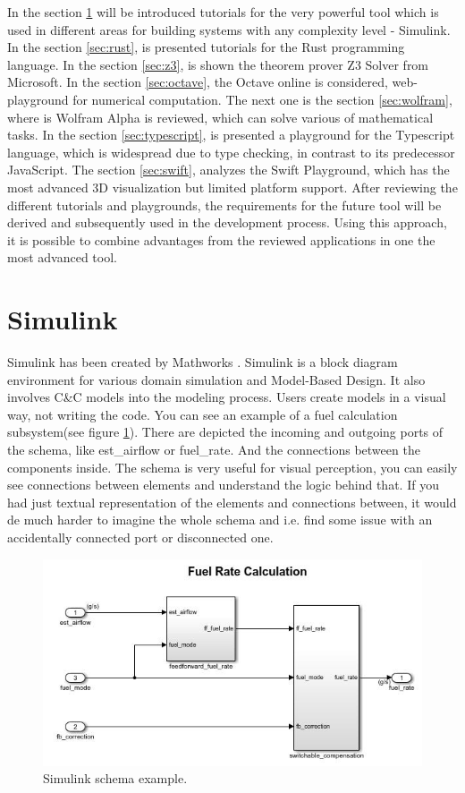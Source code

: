 In the section \ref{sec:simulink} will be introduced tutorials for the very powerful tool which is used in different areas for building systems with any complexity level - Simulink. In the section \ref{sec:rust}, is presented tutorials for the Rust programming language. In the section \ref{sec:z3}, is shown the theorem prover Z3 Solver from Microsoft. In the section \ref{sec:octave}, the Octave online is considered, web-playground for numerical computation. The next one is the section \ref{sec:wolfram}, where is Wolfram Alpha is reviewed, which can solve various of mathematical tasks. In the section \ref{sec:typescript}, is presented a playground for the Typescript language, which is widespread due to type checking, in contrast to its predecessor JavaScript. The section \ref{sec:swift}, analyzes the Swift Playground, which has the most advanced 3D visualization but limited platform support. After reviewing the different tutorials and playgrounds, the requirements for the future tool will be derived and subsequently used in the development process. Using this approach, it is possible to combine advantages from the reviewed applications in one the most advanced tool.

\section{Simulink} \label{sec:simulink}
Simulink has been created by Mathworks \cite{Mathworks}. Simulink is a block diagram environment for various domain simulation and Model-Based Design. It also involves C\&C models into the modeling process. Users create models in a visual way, not writing the code. You can see an example of a fuel calculation subsystem(see figure \ref{fig:simulink}). There are depicted the incoming and outgoing ports of the schema, like est\_airflow or fuel\_rate. And the connections between the components inside. The schema is very useful for visual perception, you can easily see connections between elements and understand the logic behind that. If you had just textual representation of the elements and connections between, it would de much harder to imagine the whole schema and i.e. find some issue with an accidentally connected port or disconnected one.

\begin{figure}[h!]
    \centering
    \includegraphics[width=0.7\linewidth]{src/pic/simulink}
    \caption{Simulink schema example.}
    \label{fig:simulink}
\end{figure}

